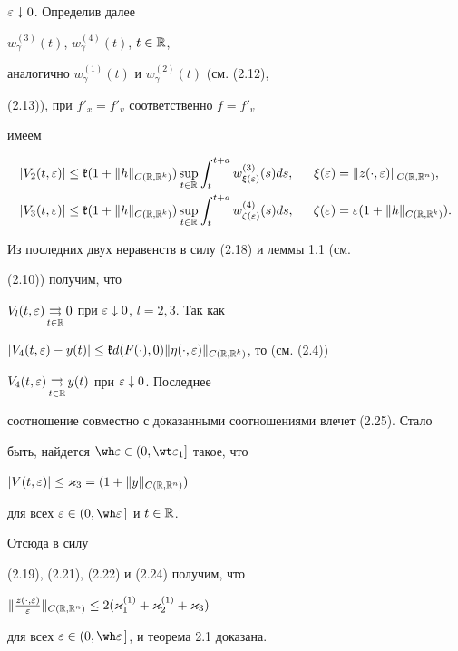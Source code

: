 $\varepsilon\downarrow 0$. Определив далее


$w_{\gamma}^{(3)}(t)$, $w_{\gamma}^{(4)}(t)$, $t\in\Bbb R$,


аналогично $w_{\gamma}^{(1)}(t)$ и $w_{\gamma}^{(2)}(t)$ (см. (2.12),


(2.13)), при $f'_{x}=f'_{v}$ соответственно $f=f'_{v}$


имеем


\begin{alignat*}{2}


|V_{2}(t,\ve)|&\le\gk(1+\|h\|_{C(\R,\R^k)})\sup_{t\in\R}


\int_{t}^{t+a}w_{\xi(\ve)}^{(3)}(s)ds,&\ \ \xi(\ve)&=


\|z(\cdot,\ve)\|_{C(\R,\R^n)}, \\


|V_{3}(t,\ve)|&\le\gk(1+\|h\|_{C(\R,\R^k)})\sup_{t\in\R}


\int_{t}^{t+a}w_{\zeta(\ve)}^{(4)}(s)ds,&\ \ \zeta(\ve)&=


\ve(1+\|h\|_{C(\R,\R^k)}).


\end{alignat*}


Из последних двух неравенств в силу (2.18) и леммы 1.1 (см.


(2.10)) получим, что


$V_{l}(t,\varepsilon)\mathop{\rightrightarrows}\limits_{t\in\Bbb R}0$ при $\varepsilon\downarrow0$, $l=2,3$. Так как


$|V_{4}(t,\ve)-y(t)|\le\gk d(F(\cdot),0)\|\eta(\cdot,\ve)


\|_{C(\R,\R^k)}$, то (см. (2.4))


$V_{4}(t,\varepsilon)\mathop{\rightrightarrows}\limits_{t\in\Bbb R}y(t)$ при $\varepsilon\downarrow0$. Последнее


соотношение совместно с доказанными соотношениями влечет (2.25). Стало


быть, найдется $\wh\ve\in(0,\wt\ve_{1}]$ такое, что


$|V(t,\varepsilon)|\le\varkappa_{3}=(1+\|y\|_{C(\Bbb R,\Bbb R^n)})$ 


для всех $\ve\in(0,\wh\ve\,]$ и $t\in\Bbb R$.


Отсюда в силу


(2.19), (2.21), (2.22) и (2.24) получим, что


$\|\frac{z(\cdot,\ve)}{\ve}\|_{C(\R,\R^n)}\le


2(\ak_{1}^{(1)}+\ak_{2}^{(1)}+\ak_{3})$ 


для всех $\ve\in(0,\wh\ve\,]$, и теорема 2.1 доказана.





